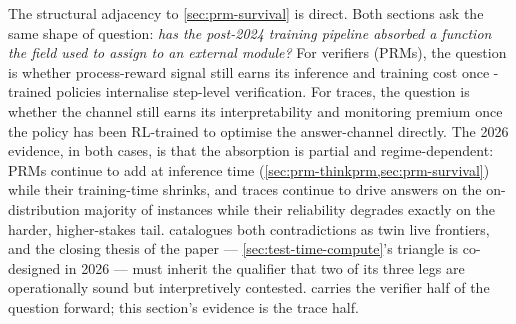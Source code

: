 The structural adjacency to \cref{sec:prm-survival} is direct. Both
sections ask the same shape of question: \emph{has the post-2024
training pipeline absorbed a function the field used to assign to an
external module?} For verifiers (PRMs), the question is whether
process-reward signal still earns its inference and training cost once
-trained policies internalise step-level verification. For traces,
the question is whether the  channel still earns its interpretability
and monitoring premium once the policy has been RL-trained to optimise
the answer-channel directly. The 2026 evidence, in both cases, is that
the absorption is partial and regime-dependent: PRMs continue to add
 at inference time (\cref{sec:prm-thinkprm,sec:prm-survival}) while
their training-time  shrinks, and traces continue to drive answers
on the on-distribution majority of instances while their reliability
degrades exactly on the harder, higher-stakes tail.
 catalogues both contradictions as twin live
frontiers, and the closing thesis of the paper —
\cref{sec:test-time-compute}'s triangle is co-designed in 2026 — must
inherit the qualifier that two of its three legs are operationally
sound but interpretively contested.  carries the
verifier half of the question forward; this section's evidence is the
trace half.
